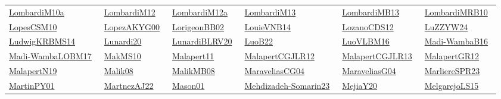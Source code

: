 \begin{longtable}{*{6}{l}}
\href{../works/LombardiM10a.pdf}{LombardiM10a}~\cite{LombardiM10a} & \href{../works/LombardiM12.pdf}{LombardiM12}~\cite{LombardiM12} & \href{../works/LombardiM12a.pdf}{LombardiM12a}~\cite{LombardiM12a} & \href{../works/LombardiM13.pdf}{LombardiM13}~\cite{LombardiM13} & \href{../works/LombardiMB13.pdf}{LombardiMB13}~\cite{LombardiMB13} & \href{../works/LombardiMRB10.pdf}{LombardiMRB10}~\cite{LombardiMRB10}\\ 
\href{../works/LopesCSM10.pdf}{LopesCSM10}~\cite{LopesCSM10} & \href{../works/LopezAKYG00.pdf}{LopezAKYG00}~\cite{LopezAKYG00} & \href{../works/LorigeonBB02.pdf}{LorigeonBB02}~\cite{LorigeonBB02} & \href{../works/LouieVNB14.pdf}{LouieVNB14}~\cite{LouieVNB14} & \href{../works/LozanoCDS12.pdf}{LozanoCDS12}~\cite{LozanoCDS12} & \href{../works/LuZZYW24.pdf}{LuZZYW24}~\cite{LuZZYW24}\\ 
\href{../works/LudwigKRBMS14.pdf}{LudwigKRBMS14}~\cite{LudwigKRBMS14} & \href{../works/Lunardi20.pdf}{Lunardi20}~\cite{Lunardi20} & \href{../works/LunardiBLRV20.pdf}{LunardiBLRV20}~\cite{LunardiBLRV20} & \href{../works/LuoB22.pdf}{LuoB22}~\cite{LuoB22} & \href{../works/LuoVLBM16.pdf}{LuoVLBM16}~\cite{LuoVLBM16} & \href{../works/Madi-WambaB16.pdf}{Madi-WambaB16}~\cite{Madi-WambaB16}\\ 
\href{../works/Madi-WambaLOBM17.pdf}{Madi-WambaLOBM17}~\cite{Madi-WambaLOBM17} & \href{../works/MakMS10.pdf}{MakMS10}~\cite{MakMS10} & \href{../works/Malapert11.pdf}{Malapert11}~\cite{Malapert11} & \href{../works/MalapertCGJLR12.pdf}{MalapertCGJLR12}~\cite{MalapertCGJLR12} & \href{../works/MalapertCGJLR13.pdf}{MalapertCGJLR13}~\cite{MalapertCGJLR13} & \href{../}{MalapertGR12}~\cite{MalapertGR12}\\ 
\href{../works/MalapertN19.pdf}{MalapertN19}~\cite{MalapertN19} & \href{../works/Malik08.pdf}{Malik08}~\cite{Malik08} & \href{../works/MalikMB08.pdf}{MalikMB08}~\cite{MalikMB08} & \href{../works/MaraveliasCG04.pdf}{MaraveliasCG04}~\cite{MaraveliasCG04} & \href{../works/MaraveliasG04.pdf}{MaraveliasG04}~\cite{MaraveliasG04} & \href{../works/MarliereSPR23.pdf}{MarliereSPR23}~\cite{MarliereSPR23}\\ 
\href{../works/MartinPY01.pdf}{MartinPY01}~\cite{MartinPY01} & \href{../}{MartnezAJ22}~\cite{MartnezAJ22} & \href{../works/Mason01.pdf}{Mason01}~\cite{Mason01} & \href{../works/Mehdizadeh-Somarin23.pdf}{Mehdizadeh-Somarin23}~\cite{Mehdizadeh-Somarin23} & \href{../works/MejiaY20.pdf}{MejiaY20}~\cite{MejiaY20} & \href{../works/MelgarejoLS15.pdf}{MelgarejoLS15}~\cite{MelgarejoLS15}\\ 

\end{longtable}
